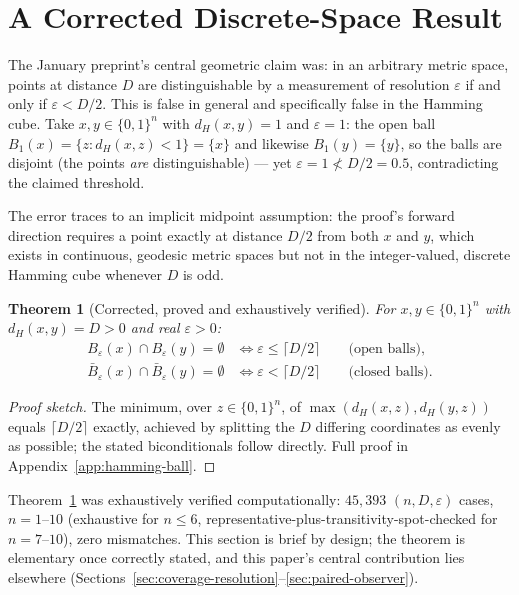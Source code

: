 \documentclass[11pt]{article}
\newtheorem{theorem}{Theorem}[section]
\theoremstyle{definition}
\theoremstyle{remark}
\newcommand{\dH}{d_H}
\begin{document}
\section{A Corrected Discrete-Space Result}
\label{sec:hamming-ball}

The January preprint's central geometric claim was: in an arbitrary metric space, points at distance $D$ are distinguishable by a measurement of resolution $\varepsilon$ if and only if $\varepsilon < D/2$. This is false in general and specifically false in the Hamming cube. Take $x,y \in \{0,1\}^n$ with $\dH(x,y)=1$ and $\varepsilon=1$: the open ball $B_1(x) = \{z : \dH(x,z)<1\} = \{x\}$ and likewise $B_1(y)=\{y\}$, so the balls are disjoint (the points \emph{are} distinguishable) --- yet $\varepsilon=1 \not< D/2 = 0.5$, contradicting the claimed threshold.

The error traces to an implicit midpoint assumption: the proof's forward direction requires a point exactly at distance $D/2$ from both $x$ and $y$, which exists in continuous, geodesic metric spaces but not in the integer-valued, discrete Hamming cube whenever $D$ is odd.

\begin{theorem}[Corrected, proved and exhaustively verified]
\label{thm:hamming-ball}
For $x,y \in \{0,1\}^n$ with $\dH(x,y)=D>0$ and real $\varepsilon>0$:
\begin{align}
B_\varepsilon(x) \cap B_\varepsilon(y) = \emptyset &\iff \varepsilon \le \lceil D/2 \rceil \qquad \text{(open balls)}, \\
\bar B_\varepsilon(x) \cap \bar B_\varepsilon(y) = \emptyset &\iff \varepsilon < \lceil D/2 \rceil \qquad \text{(closed balls)}.
\end{align}
\end{theorem}

\begin{proof}[Proof sketch]
The minimum, over $z \in \{0,1\}^n$, of $\max(\dH(x,z), \dH(y,z))$ equals $\lceil D/2 \rceil$ exactly, achieved by splitting the $D$ differing coordinates as evenly as possible; the stated biconditionals follow directly. Full proof in Appendix~\ref{app:hamming-ball}.
\end{proof}

Theorem~\ref{thm:hamming-ball} was exhaustively verified computationally: $45{,}393$ $(n,D,\varepsilon)$ cases, $n=1$--$10$ (exhaustive for $n \le 6$, representative-plus-transitivity-spot-checked for $n=7$--$10$), zero mismatches. This section is brief by design; the theorem is elementary once correctly stated, and this paper's central contribution lies elsewhere (Sections~\ref{sec:coverage-resolution}--\ref{sec:paired-observer}).
\end{document}
